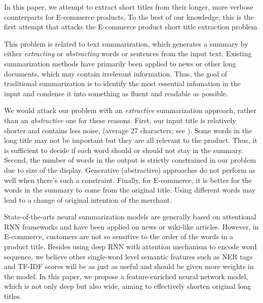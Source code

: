 In this paper, we attempt to extract short titles from 
their longer, more verbose counterparts for E-commerce products.
To the best of our knowledge, this is the first attempt that attacks the 
E-commerce product short title extraction problem.

This problem is related to text summarization, 
which generates a summary by either {\em extracting} or {\em abstracting}
words or sentences from the input text. 
Existing summarization methods have primarily been applied to news or 
other long documents, which may contain irrelevant information. 
Thus, the goal of traditional summarization is to identify
the most essential infomation in the input and condense
it into something as fluent and readable as possible. 

We would attack our problem with an \textit{extractive} summarization 
approach, rather than an {\em abstractive} one for these reasons.
First, our input title is relatively shorter and contains less noise,
(average 27 characters; see ).
Some words in the long title may not be important but they are all relevant 
to the product. Thus, it is sufficient to decide if each word should or 
should not stay in the summary. 
Second, the number of words in the output is strictly constrained in 
our problem due to size of the display. 
Generative (abstractive) approaches do not perform as well when there's
such a constraint.
Finally, for E-commerce, it is better for the words in the summary to come 
from the original title. 
Using different words may lead to a change of original intention of
the merchant.


State-of-the-arts neural summarization models
\cite{cheng2016neural,narayan2017neural}
are generally based on attentional RNN frameworks and  have been applied
on news or wiki-like articles.
However, in E-commerce, 
customers are not so sensitive to the order of the words in a product title. 
Besides using deep RNN with attention mechanism to encode word sequence, 
we believe other single-word level semantic features such as NER tags and 
TF-IDF scores
will be as just as useful and should be given more weights in the model.
In this paper, we propose a feature-enriched neural network model, 
which is not only deep but also wide, 
aiming to effectively shorten original long titles.

